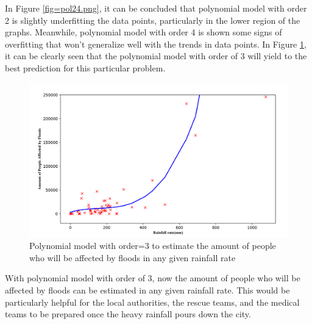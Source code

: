 \noindent 
In Figure \ref{fig=pol24.png}, it can be concluded that polynomial model with order 2 is slightly underfitting the data points, particularly in the lower region of the graphs. Meanwhile, polynomial model with order 4 is shown some signs of overfitting that won't generalize well with the trends in data points. In Figure \ref{fig=corrrainpeopreg.png}, it can be clearly seen that the polynomial model with order of 3 will yield to the best prediction for this particular problem.\\

\begin{figure}
\begin{center}
\graphicspath{ {./Pict/} }
\includegraphics[scale=0.15]{corrrainpeopreg.png}
\caption{Polynomial model with order=3 to estimate the amount of people who will be affected by floods in any given rainfall rate}\label{fig=corrrainpeopreg.png}
\end{center}
\end{figure}
\noindent
With polynomial model with order of 3, now the amount of people who will be affected by floods can be estimated in any given rainfall rate. This would be particularly helpful for the local authorities, the rescue teams, and the medical teams to be prepared once the heavy rainfall pours down the city.


